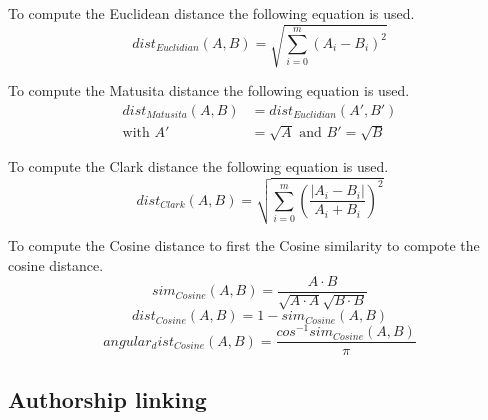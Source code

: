 \begin{definition}
  To compute the Euclidean distance the following equation is used.
  \begin{equation}
    dist_{Euclidian}(A, B) = \sqrt{\sum_{i=0}^{m}(A_i - B_i)^2}
  \end{equation}
\end{definition}

\begin{definition}
  To compute the Matusita distance the following equation is used.
  \begin{equation}
    \begin{split}
      dist_{Matusita}(A, B) &= dist_{Euclidian}(A', B') \\
      \text{with }A' &= \sqrt{A}\text{ and }B' = \sqrt{B}
    \end{split}
  \end{equation}
\end{definition}

\begin{definition}
  To compute the Clark distance the following equation is used.
  \begin{equation}
    dist_{Clark}(A, B) = \sqrt{\sum_{i=0}^{m}\left(\frac{|A_i - B_i|}{A_i + B_i}\right)^2}
  \end{equation}
\end{definition}

\begin{definition}
  To compute the Cosine distance to first the Cosine similarity to compote the cosine distance.
  \begin{equation}
    sim_{Cosine}(A, B) = \frac{A \cdot B}{\sqrt{A \cdot A}\sqrt{B \cdot B}}
  \end{equation}
  \begin{equation}
    dist_{Cosine}(A, B) = 1 - sim_{Cosine}(A, B)
  \end{equation}
  \begin{equation}
    angular_dist_{Cosine}(A, B) = \frac{cos^{-1}sim_{Cosine}(A, B)}{\pi}
  \end{equation}
\end{definition}

\subsection{Authorship linking}

